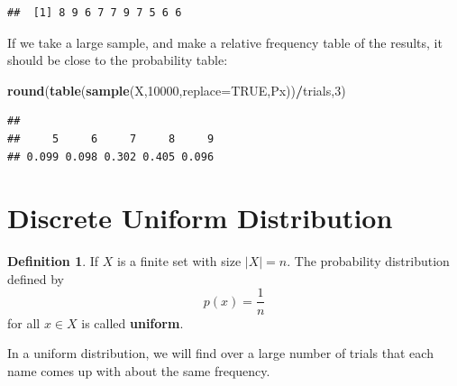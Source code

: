 \documentclass[
]{book}
\newenvironment{Shaded}{\begin{snugshade}}{\end{snugshade}}
\newcommand{\AttributeTok}[1]{\textcolor[rgb]{0.13,0.29,0.53}{#1}}
\newcommand{\ConstantTok}[1]{\textcolor[rgb]{0.56,0.35,0.01}{#1}}
\newcommand{\DecValTok}[1]{\textcolor[rgb]{0.00,0.00,0.81}{#1}}
\newcommand{\FunctionTok}[1]{\textcolor[rgb]{0.13,0.29,0.53}{\textbf{#1}}}
\newcommand{\NormalTok}[1]{#1}
\newcommand{\SpecialCharTok}[1]{\textcolor[rgb]{0.81,0.36,0.00}{\textbf{#1}}}
\theoremstyle{definition}
\newtheorem{definition}{Definition}[chapter]
\theoremstyle{definition}
\theoremstyle{definition}
\theoremstyle{definition}
\theoremstyle{remark}
\begin{document}
\begin{verbatim}
##  [1] 8 9 6 7 7 9 7 5 6 6
\end{verbatim}

If we take a large sample, and make a relative frequency table of the results, it should be close to the probability table:

\begin{Shaded}
\begin{Highlighting}[]
\FunctionTok{round}\NormalTok{(}\FunctionTok{table}\NormalTok{(}\FunctionTok{sample}\NormalTok{(X,}\DecValTok{10000}\NormalTok{,}\AttributeTok{replace=}\ConstantTok{TRUE}\NormalTok{,Px))}\SpecialCharTok{/}\NormalTok{trials,}\DecValTok{3}\NormalTok{)}
\end{Highlighting}
\end{Shaded}

\begin{verbatim}
## 
##     5     6     7     8     9 
## 0.099 0.098 0.302 0.405 0.096
\end{verbatim}

\section{Discrete Uniform Distribution}\label{discrete-uniform-distribution}

\begin{definition}
\protect\hypertarget{def:discrete-uniform}{}\label{def:discrete-uniform}If \(X\) is a finite set with size \(|X| = n\). The probability distribution defined by \[p(x) = \frac{1}{n}\] for all \(x \in X\) is called \textbf{uniform}.
\end{definition}

In a uniform distribution, we will find over a large number of trials that each name comes up with about the same frequency.
\end{document}
